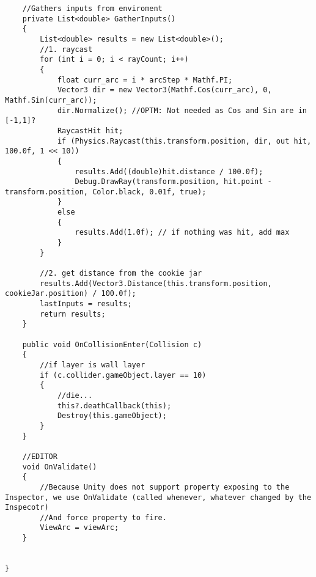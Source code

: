 \documentclass[12pt,a4paper]{article}
\begin{document}
\begin{lstlisting}
    //Gathers inputs from enviroment
    private List<double> GatherInputs()
    {
        List<double> results = new List<double>();
        //1. raycast 
        for (int i = 0; i < rayCount; i++)
        {
            float curr_arc = i * arcStep * Mathf.PI;
            Vector3 dir = new Vector3(Mathf.Cos(curr_arc), 0, Mathf.Sin(curr_arc));
            dir.Normalize(); //OPTM: Not needed as Cos and Sin are in [-1,1]?
            RaycastHit hit;
            if (Physics.Raycast(this.transform.position, dir, out hit, 100.0f, 1 << 10))
            {
                results.Add((double)hit.distance / 100.0f);
                Debug.DrawRay(transform.position, hit.point - transform.position, Color.black, 0.01f, true);
            }
            else
            {
                results.Add(1.0f); // if nothing was hit, add max
            }
        }

        //2. get distance from the cookie jar
        results.Add(Vector3.Distance(this.transform.position, cookieJar.position) / 100.0f);
        lastInputs = results;
        return results;
    }

    public void OnCollisionEnter(Collision c)
    {
        //if layer is wall layer
        if (c.collider.gameObject.layer == 10)
        {
            //die...
            this?.deathCallback(this);
            Destroy(this.gameObject);
        }
    }

    //EDITOR
    void OnValidate()
    {
        //Because Unity does not support property exposing to the Inspector, we use OnValidate (called whenever, whatever changed by the Inspecotr)
        //And force property to fire.
        ViewArc = viewArc;
    }


}





\end{lstlisting}
\pagebreak
\end{document}
